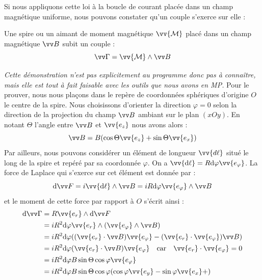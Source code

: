 \documentclass[11pt,fleqn]{book} %
\newcommand{\dd}{\mathrm{d}}
\begin{document}
Si nous appliquons cette loi à la boucle de courant placée dans un champ magnétique uniforme, nous pouvons constater qu'un couple s'exerce sur elle :
\begin{proposition}
    Une spire ou un aimant de moment magnétique $\vv{\mathcal{M}}$ placé dans un champ magnétique $\vv B$ subit un couple :
    \begin{equation}
        \vv \Gamma = \vv{\mathcal{M}} \wedge \vv B
    \end{equation}
\end{proposition}
\begin{demonstration}
\textit{Cette démonstration n'est pas explicitement au programme donc pas à connaître, mais elle est tout à fait faisable avec les outils que nous avons en MP.}
Pour le prouver, nous nous plaçons dans le repère de coordonnées sphériques d'origine $O$ le centre de la spire. Nous choisissons d'orienter la direction $\varphi=0$ selon la direction de la projection du champ $\vv B$ ambiant sur le plan $(xOy)$. En notant $\Theta$ l'angle entre $\vv B$ et $\vv{e_z}$ nous avons alors :
\begin{equation}
\vv B = B (\cos \Theta \vv{e_z} + \sin \Theta \vv{e_x})
\end{equation}
Par ailleurs, nous pouvons considérer un élément de longueur $\vv{d\ell}$ situé le long de la spire et repéré par sa coordonnée $\varphi$. On a $\vv{\dd \ell} = R \dd \varphi \vv{e_\varphi}$. La force de Laplace qui s'exerce sur cet élément est donnée par :
\begin{equation}
\dd \vv F = i \vv{\dd \ell} \wedge \vv B = i R \dd \varphi \vv{e_\varphi} \wedge \vv B 
\end{equation}
et le moment de cette force par rapport à $O$ s'écrit ainsi :
\begin{align}
\dd \vv \Gamma &= R \vv{e_r} \wedge \dd \vv F \\
&= i R^2 \dd \varphi \vv{e_r} \wedge (\vv{e_\varphi} \wedge \vv B) \\
&= i R^2 \dd \varphi ( (\vv{e_r} \cdot \vv B) \vv{e_\varphi} - (\vv{e_r} \cdot \vv{e_\varphi}) \vv B) \\
&= i R^2 \dd \varphi (\vv{e_r} \cdot \vv B) \vv{e_\varphi} \quad \mathrm{car} \quad \vv{e_r} \cdot \vv{e_\varphi} = 0 \\
&= i R^2 \dd \varphi B \sin \Theta \cos \varphi \vv{e_\varphi} \\
&= i R^2 \dd \varphi B \sin \Theta \cos \varphi (\cos \varphi \vv{e_y}-\sin \varphi \vv{e_x} + )
\end{align}

\end{demonstration}
\end{document}
